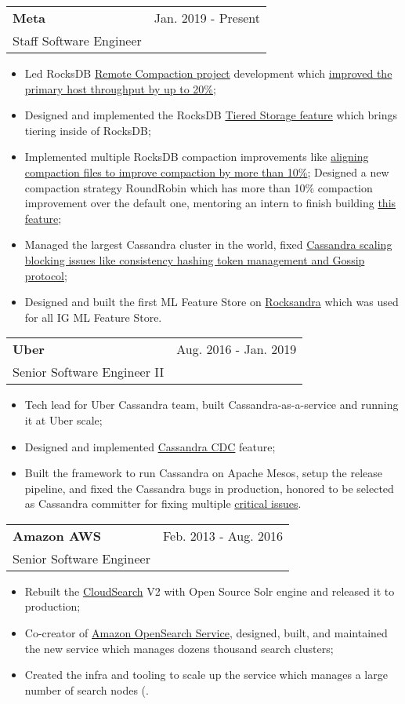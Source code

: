 \documentclass[letterpaper,11pt]{article}
\makeatletter
\newcommand{\resumeItem}[1]{
  \item{
    {#1 \vspace{-2pt}}
  }
}
\newcommand{\resumeSubheading}[4]{
  \vspace{-2pt}\item
    \begin{tabular*}{0.97\textwidth}[t]{l@{\extracolsep{\fill}}r}
      \textbf{\large#1} & {\large#2} \\
      {\large#3} & \textit{\small #4} \\
    \end{tabular*}\vspace{-10pt}
}
\newcommand{\resumeItemListStart}{\begin{itemize}}
\newcommand{\resumeItemListEnd}{\end{itemize}\vspace{-2pt}}
\makeatother
\begin{document}
    \resumeSubheading
      {Meta}{Jan. 2019 - Present}
      {Staff Software Engineer}{}
      \resumeItemListStart
        \small\resumeItem{Led RocksDB \href{https://github.com/facebook/rocksdb/wiki/Remote-Compaction-\%28Experimental\%29}{Remote Compaction project} development which \href{https://drive.google.com/file/d/1PBFwP6VFg-EQemPJaeLwIsZMq5K0kwg7/view?usp=share_link}{improved the primary host throughput by up to 20\%};}
        \resumeItem{Designed and implemented the RocksDB \href{https://github.com/facebook/rocksdb/wiki/Tiered-Storage-\%28Experimental\%29}{Tiered Storage feature} which brings tiering inside of RocksDB;}
        \resumeItem{Implemented multiple RocksDB compaction improvements like \href{https://rocksdb.org/blog/2022/10/31/align-compaction-output-file.html}{aligning compaction files to improve compaction by more than 10\%}; Designed a new compaction strategy RoundRobin which has more than 10\% compaction improvement over the default one, mentoring an intern to finish building \href{https://github.com/facebook/rocksdb/blob/b0d9776b704af01c2b5385e9d53754e0c8176373/include/rocksdb/advanced_options.h\#L58-L62}{this feature};}
        \resumeItem{Managed the largest Cassandra cluster in the world, fixed \href{https://github.com/ngcc/ngcc2019/blob/master/CassandraTokenManagement.pdf}{Cassandra scaling blocking issues like consistency hashing token management and Gossip protocol};}
        \resumeItem{Designed and built the first ML Feature Store on \href{https://github.com/Instagram/cassandra}{Rocksandra} which was used for all IG ML Feature Store.}
        \resumeItemListEnd

    \resumeSubheading
      {Uber}{Aug. 2016 - Jan. 2019}
      {Senior Software Engineer II}{}
      \resumeItemListStart
        \small\resumeItem{Tech lead for Uber Cassandra team, built Cassandra-as-a-service and running it at Uber scale;}
        \resumeItem{Designed and implemented \href{https://github.com/ngcc/ngcc2017/blob/master/CassandraDataIngestion.pdf}{Cassandra CDC} feature;}
        \resumeItem{Built the framework to run Cassandra on Apache Mesos, setup the release pipeline, and fixed the Cassandra bugs in production, honored to be selected as Cassandra committer for fixing multiple \href{https://issues.apache.org/jira/browse/CASSANDRA-15291?jql=assignee\%20\%3D\%20jay.zhuang}{critical issues}.}
        \resumeItemListEnd

    \resumeSubheading
      {Amazon AWS}{Feb. 2013 - Aug. 2016}
      {Senior Software Engineer}{}
      \resumeItemListStart
        \small
        \resumeItem{Rebuilt the \href{https://aws.amazon.com/cloudsearch/}{CloudSearch} V2 with Open Source Solr engine and released it to production;}
        \resumeItem{Co-creator of \href{https://aws.amazon.com/opensearch-service/}{Amazon OpenSearch Service}, designed, built, and maintained the new service which manages dozens thousand search clusters;}
        \resumeItem{Created the infra and tooling to scale up the service which manages a large number of search nodes (.}
        \resumeItemListEnd
        
\end{document}
